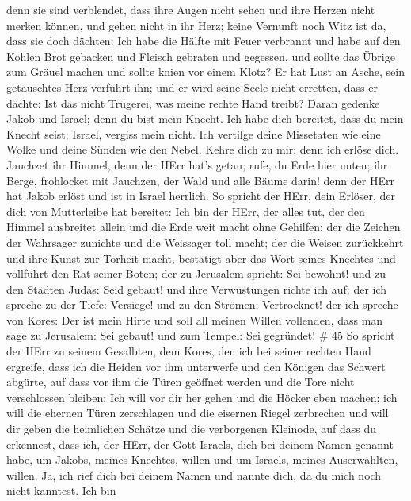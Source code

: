 denn sie sind verblendet, dass ihre Augen nicht sehen und ihre Herzen
nicht merken können,  und gehen nicht in ihr Herz; keine
Vernunft noch Witz ist da, dass sie doch dächten: Ich habe die Hälfte
mit Feuer verbrannt und habe auf den Kohlen Brot gebacken und Fleisch
gebraten und gegessen, und sollte das Übrige zum Gräuel machen und
sollte knien vor einem Klotz?  Er hat Lust an Asche, sein
getäuschtes Herz verführt ihn; und er wird seine Seele nicht erretten,
dass er dächte: Ist das nicht Trügerei, was meine rechte Hand treibt?
 Daran gedenke Jakob und Israel; denn du bist mein Knecht.
Ich habe dich bereitet, dass du mein Knecht seist; Israel, vergiss mein
nicht.  Ich vertilge deine Missetaten wie eine Wolke und
deine Sünden wie den Nebel. Kehre dich zu mir; denn ich erlöse dich.
 Jauchzet ihr Himmel, denn der HErr hat's getan; rufe, du
Erde hier unten; ihr Berge, frohlocket mit Jauchzen, der Wald und alle
Bäume darin! denn der HErr hat Jakob erlöst und ist in Israel herrlich.
 So spricht der HErr, dein Erlöser, der dich von
Mutterleibe hat bereitet: Ich bin der HErr, der alles tut, der den
Himmel ausbreitet allein und die Erde weit macht ohne Gehilfen;
 der die Zeichen der Wahrsager zunichte und die Weissager
toll macht; der die Weisen zurückkehrt und ihre Kunst zur Torheit macht,
 bestätigt aber das Wort seines Knechtes und vollführt den
Rat seiner Boten; der zu Jerusalem spricht: Sei bewohnt! und zu den
Städten Judas: Seid gebaut! und ihre Verwüstungen richte ich auf;
 der ich spreche zu der Tiefe: Versiege! und zu den
Strömen: Vertrocknet!  der ich spreche von Kores: Der ist
mein Hirte und soll all meinen Willen vollenden, dass man sage zu
Jerusalem: Sei gebaut! und zum Tempel: Sei gegründet! \# 45 
So spricht der HErr zu seinem Gesalbten, dem Kores, den ich bei seiner
rechten Hand ergreife, dass ich die Heiden vor ihm unterwerfe und den
Königen das Schwert abgürte, auf dass vor ihm die Türen geöffnet werden
und die Tore nicht verschlossen bleiben:  Ich will vor dir
her gehen und die Höcker eben machen; ich will die ehernen Türen
zerschlagen und die eisernen Riegel zerbrechen  und will dir
geben die heimlichen Schätze und die verborgenen Kleinode, auf dass du
erkennest, dass ich, der HErr, der Gott Israels, dich bei deinem Namen
genannt habe,  um Jakobs, meines Knechtes, willen und um
Israels, meines Auserwählten, willen. Ja, ich rief dich bei deinem Namen
und nannte dich, da du mich noch nicht kanntest.  Ich bin
